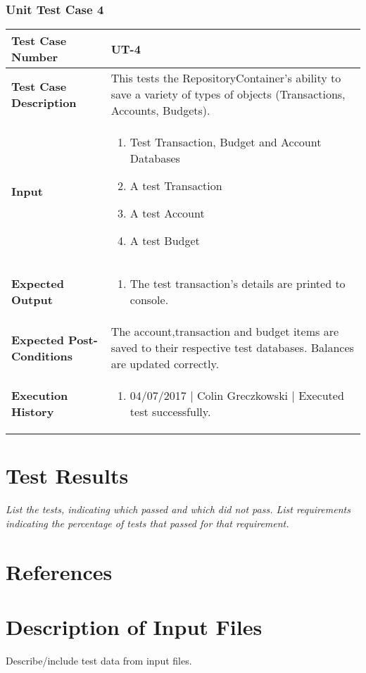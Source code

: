 \documentclass[12pt]{article}
\begin{document}
\subsubsection{Unit Test Case 4} \label{tc:1}
\begin{table}[htbp]
\centering
\label{UT-4}
\begin{tabularx}{\textwidth}{ | l | X |}
\hline
\textbf{Test Case Number}      &  UT-4                         \\ \hline
\textbf{Test Case Description}    &  This tests the RepositoryContainer's ability to save a variety of types of objects (Transactions, Accounts, Budgets).                \\ \hline
\textbf{Input}         & 	\begin{enumerate}
          \item Test Transaction, Budget and Account Databases
	\item A test Transaction
	\item A test Account
	\item A test Budget
\end{enumerate} \\ \hline

\textbf{Expected Output}     & \begin{enumerate}
	\item The test transaction's details are printed to console.
\end{enumerate} \\ \hline
\textbf{Expected Post-Conditions}           & The account,transaction and budget items are saved to their respective test databases. Balances are updated correctly.                \\ \hline
\textbf{Execution History}   &  \begin{enumerate}
	\item 04/07/2017 | Colin Greczkowski | Executed test successfully.
\end {enumerate} \\ \hline
\end{tabularx}
\end{table}
\clearpage

\section{Test Results}

{\it
List the tests, indicating which passed and which did not pass.
List requirements indicating the percentage of tests that passed for that requirement.
}

\section{References}

\appendix

\section{Description of Input Files}

Describe/include test data from input files.
\end{document}
